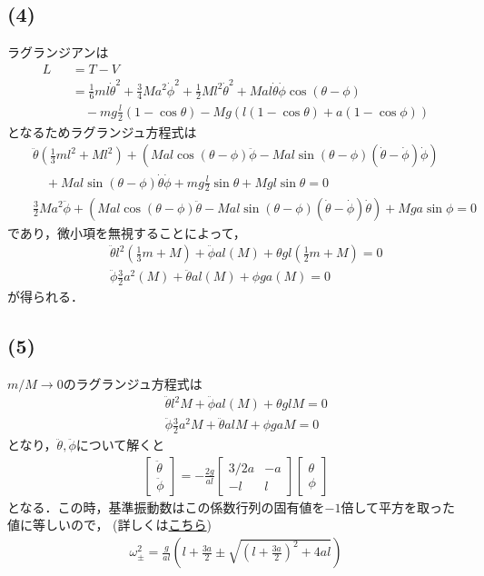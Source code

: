 \documentclass[12pt,dvipdfmx]{jsarticle}
\begin{document}
\subsection*{\large{(4)}}
ラグランジアンは
\begin{eqnarray}
  L &&= T-V \\
  &&= \frac{1}{6}ml\dot{\theta}^2 + \frac{3}{4}Ma^2\dot{\phi}^2 + \frac{1}{2}Ml^2\dot{\theta}^2 + Mal\dot{\theta}\dot{\phi}\cos(\theta-\phi) \\
  &&\quad-mg \frac{l}{2}(1-\cos\theta)-Mg \left( l(1-\cos\theta) + a(1-\cos\phi) \right)
\end{eqnarray}
となるためラグランジュ方程式は
\begin{eqnarray}
  &&\ddot{\theta}\left( \frac{1}{3}ml^2 + Ml^2 \right)+ \left( Mal\cos(\theta-\phi)\ddot{\phi}-Mal\sin(\theta-\phi)(\dot{\theta}-\dot{\phi})\dot{\phi} \right)\\
  &&\quad + Mal\sin(\theta-\phi)\dot{\theta}\dot{\phi}+mg\frac{l}{2}\sin\theta +Mgl\sin\theta =0\\
  &&\frac{3}{2}Ma^2 \ddot{\phi} + \left( Mal \cos(\theta-\phi)\ddot{\theta}-Mal\sin(\theta-\phi)(\dot{\theta}-\dot{\phi})\dot{\theta} \right) + Mga\sin\phi =0
\end{eqnarray}
であり，微小項を無視することによって，
\begin{eqnarray}
  &&\ddot{\theta}l^2\left( \frac{1}{3}m + M \right) + \ddot{\phi}al(M) + \theta gl \left( \frac{1}{2}m +M \right) =0\\
  &&\ddot{\phi}\frac{3}{2}a^2 (M) + \ddot{\theta}al(M) + \phi ga (M) =0
\end{eqnarray}
が得られる．
\subsection*{\large{(5)}}
$m/M\to 0$のラグランジュ方程式は
\begin{eqnarray}
  &&\ddot{\theta}l^2M + \ddot{\phi}al(M) + \theta gl M =0\\
  &&\ddot{\phi}\frac{3}{2}a^2 M + \ddot{\theta}alM + \phi ga M =0
\end{eqnarray}
となり，$\ddot{\theta},\ddot{\phi}$について解くと
\begin{eqnarray}
  \begin{bmatrix}
    \ddot{\theta}\\
    \ddot{\phi}
  \end{bmatrix}
  =-\frac{2g}{al}
  \begin{bmatrix}
    3/2a & -a \\
    -l & l    
  \end{bmatrix}
  \begin{bmatrix}
    \theta \\
    \phi
  \end{bmatrix}
\end{eqnarray}
となる．この時，基準振動数はこの係数行列の固有値を$-1$倍して平方を取った値に等しいので，
(詳しくは\href{http://ishi-lab.mp.es.osaka-u.ac.jp/lecture/Mech2/%E9%80%A3%E6%88%90%E6%8C%AF%E5%8B%95%E3%83%86%E3%82%AD%E3%82%B9%E3%83%88.PDF}{こちら})
\begin{eqnarray}
  \omega_{\pm}^2 = \frac{g}{al}\left( l+\frac{3a}{2} \pm \sqrt{ \left( l+\frac{3a}{2} \right)^2 +4al } \right)
\end{eqnarray}
\end{document}
